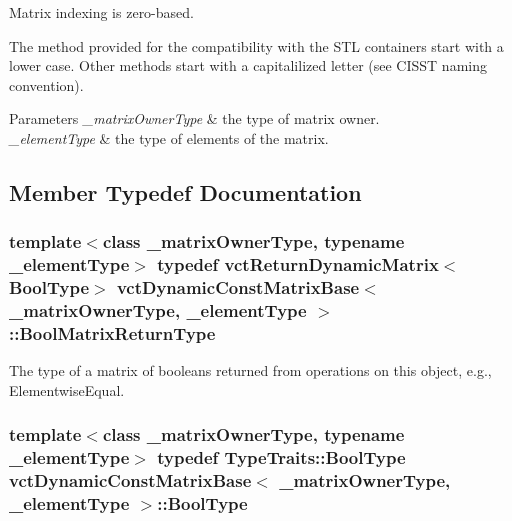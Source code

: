 Matrix indexing is zero-\/based.

The method provided for the compatibility with the S\-T\-L containers start with a lower case. Other methods start with a capitalilized letter (see C\-I\-S\-S\-T naming convention).


\begin{DoxyParams}{Parameters}
{\em \-\_\-matrix\-Owner\-Type} & the type of matrix owner.\\
\hline
{\em \-\_\-element\-Type} & the type of elements of the matrix. \\
\hline
\end{DoxyParams}


\subsection{Member Typedef Documentation}
\hypertarget{classvct_dynamic_const_matrix_base_ac71d88dda7abaaeb2276b83f2e49def7}{
\subsubsection[{Bool\-Matrix\-Return\-Type}]{\setlength{\rightskip}{0pt plus 5cm}template$<$class \-\_\-matrix\-Owner\-Type, typename \-\_\-element\-Type$>$ typedef {\bf vct\-Return\-Dynamic\-Matrix}$<${\bf Bool\-Type}$>$ {\bf vct\-Dynamic\-Const\-Matrix\-Base}$<$ \-\_\-matrix\-Owner\-Type, \-\_\-element\-Type $>$\-::{\bf Bool\-Matrix\-Return\-Type}}}\label{classvct_dynamic_const_matrix_base_ac71d88dda7abaaeb2276b83f2e49def7}
The type of a matrix of booleans returned from operations on this object, e.\-g., Elementwise\-Equal. \hypertarget{classvct_dynamic_const_matrix_base_acc160095f46a6928d71f3eb7d33a1b12}{
\subsubsection[{Bool\-Type}]{\setlength{\rightskip}{0pt plus 5cm}template$<$class \-\_\-matrix\-Owner\-Type, typename \-\_\-element\-Type$>$ typedef {\bf Type\-Traits\-::\-Bool\-Type} {\bf vct\-Dynamic\-Const\-Matrix\-Base}$<$ \-\_\-matrix\-Owner\-Type, \-\_\-element\-Type $>$\-::{\bf Bool\-Type}}}\label{classvct_dynamic_const_matrix_base_acc160095f46a6928d71f3eb7d33a1b12}
